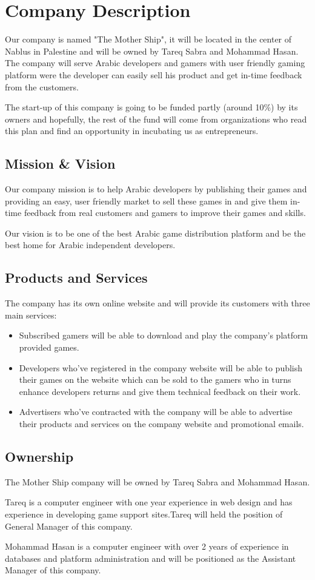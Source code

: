 \documentclass[fontsize=14pt,svgnames]{scrreprt}
\begin{document}
\chapter{Company Description}
Our company is named "The Mother Ship", it will be located in the center of Nablus in Palestine and will be owned by Tareq Sabra and Mohammad Hasan. The company will serve Arabic developers and gamers with user friendly gaming platform were the developer can easily sell his product and get in-time feedback from the customers.
\par The start-up of this company is going to be funded partly (around 10\%) by its owners and hopefully, the rest of the fund will come from organizations who read this plan and find an opportunity in incubating us as entrepreneurs.  
\section{Mission \& Vision}
Our company mission is to help Arabic developers by publishing their games 
and providing an easy, user friendly market to sell these games in and give them in-time feedback from real customers and gamers to improve their games and skills.
\par Our vision is to be one of the best Arabic game distribution platform and be the best home for Arabic independent developers.
\section{Products and Services}
The company  has its own online website and will provide its customers with three main services:
\begin{itemize}
\item Subscribed gamers will be able to download and play the company's platform provided games.
\item Developers who've registered in the company website will be able to publish their games on the website which can be sold to the gamers who in turns enhance developers returns and give them technical feedback on their work.
\item Advertisers who've contracted with the company will be able to advertise their products and services on the company website and promotional emails.
\end{itemize}
\section{Ownership}
The Mother Ship company will be owned by Tareq Sabra and Mohammad Hasan.\par Tareq is a computer engineer with one year experience in web design and has experience in developing game support sites.Tareq will held the position of General Manager of this company.
\par Mohammad Hasan is a computer engineer with over 2 years of experience in databases and platform administration and will be positioned as the Assistant Manager of this company.
\end{document}
